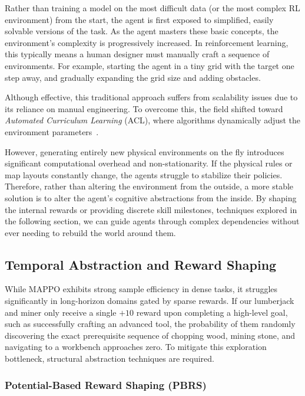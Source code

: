 Rather than training a model on the most difficult data (or the most complex RL environment) from the start, the agent is first exposed to simplified, easily solvable versions of the task. As the agent masters these basic concepts, the environment's complexity is progressively increased. In reinforcement learning, this typically means a human designer must manually craft a sequence of environments. For example, starting the agent in a tiny grid with the target one step away, and gradually expanding the grid size and adding obstacles. 

Although effective, this traditional approach suffers from scalability issues due to its reliance on manual engineering. 
To overcome this, the field shifted toward \emph{Automated Curriculum Learning} (ACL), where algorithms dynamically adjust the environment parameters~\parencite{Portelas_Colas_Weng_Hofmann_Oudeyer_2020}. 

However, generating entirely new physical environments on the fly introduces significant computational overhead and non-stationarity. If the physical rules or map layouts constantly change, the agents struggle to stabilize their policies. Therefore, rather than altering the environment from the outside, a more stable solution is to alter the agent's cognitive abstractions from the inside. By shaping the internal rewards or providing discrete skill milestones, techniques explored in the following section, we can guide agents through complex dependencies without ever needing to rebuild the world around them.

\subsection{Temporal Abstraction and Reward Shaping}
\label{sec:abstraction_shaping}

While MAPPO exhibits strong sample efficiency in dense tasks, it struggles significantly in long-horizon domains gated by sparse rewards. If our lumberjack and miner only receive a single $+10$ reward upon completing a high-level goal, such as successfully crafting an advanced tool, the probability of them randomly discovering the exact prerequisite sequence of chopping wood, mining stone, and navigating to a workbench approaches zero. To mitigate this exploration bottleneck, structural abstraction techniques are required.

\subsubsection{Potential-Based Reward Shaping (PBRS)}
\label{subsec:pbrs}

